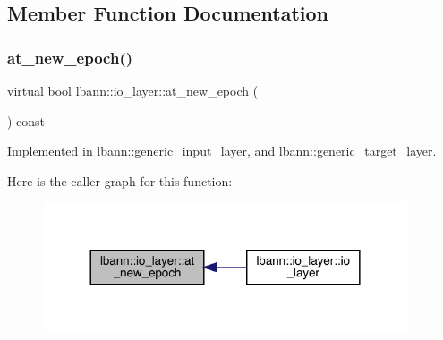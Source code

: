 \subsection{Member Function Documentation}
\mbox{\label{classlbann_1_1io__layer_a0cedc21bf38c1e3d60a93b41981a1626}} 
\subsubsection{\texorpdfstring{at\+\_\+new\+\_\+epoch()}{at\_new\_epoch()}}
{\footnotesize\ttfamily virtual bool lbann\+::io\+\_\+layer\+::at\+\_\+new\+\_\+epoch (\begin{DoxyParamCaption}{ }\end{DoxyParamCaption}) const\hspace{0.3cm}{\ttfamily [pure virtual]}}



Implemented in \hyperlink{classlbann_1_1generic__input__layer_a8b375ab97f38166872e4aa9baeca0715}{lbann\+::generic\+\_\+input\+\_\+layer}, and \hyperlink{classlbann_1_1generic__target__layer_a9bdeadd84f0b4f31b755fdd338492b1a}{lbann\+::generic\+\_\+target\+\_\+layer}.

Here is the caller graph for this function\+:\nopagebreak
\begin{figure}[H]
\begin{center}
\leavevmode
\includegraphics[width=305pt]{classlbann_1_1io__layer_a0cedc21bf38c1e3d60a93b41981a1626_icgraph}
\end{center}
\end{figure}
\mbox{\label{classlbann_1_1io__layer_a67feb9fd903ef4d2ca782bbe7860a413}} 
